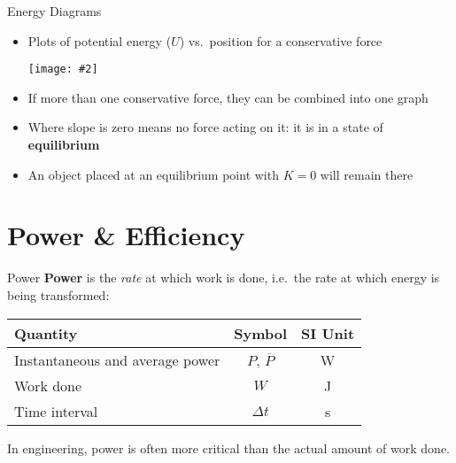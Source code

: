 \documentclass[12pt,compress,aspectratio=169]{beamer}
\newcommand{\pic}[2]{\texttt{[image: \#2]}}
\newcommand{\eq}[2]{\vspace{#1}{\Large\begin{displaymath}#2\end{displaymath}}}
\begin{document}
\begin{frame}{Energy Diagrams}
  \begin{itemize}
  \item Plots of potential energy ($U$) vs.\ position for a conservative force
    \begin{center}
      \pic{.5}{energy-diagram.png}
    \end{center}
  \item If more than one conservative force, they can be combined into one graph
  \item Where slope is zero means no force acting on it: it is in a state of
    \textbf{equilibrium}
  \item An object placed at an equilibrium point with $K=0$ will remain there
  \end{itemize}
\end{frame}


\section{Power \& Efficiency}

\begin{frame}{Power}
  \textbf{Power} is the \emph{rate} at which work is done, i.e.\ the rate at
  which energy is being transformed:

  \eq{-.2in}{
    \boxed{P(t) = \frac{dW}{dt}}\quad\quad
    \boxed{\overline{P} = \frac{W}{\Delta t}}
  }
  \begin{center}
    \begin{tabular}{l|c|c}
      \rowcolor{pink}
      \textbf{Quantity}  & \textbf{Symbol} & \textbf{SI Unit} \\ \hline
      Instantaneous and average power & $P$, $\overline{P}$ & \si{\watt} \\
      Work done          & $W$ & \si{\joule} \\
      Time interval      & $\Delta t$ & \si{\second}
    \end{tabular}
  \end{center}
  In engineering, power is often more critical than the actual amount of work
  done.
\end{frame}
\end{document}
